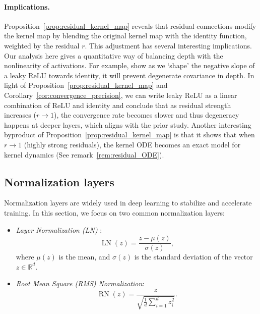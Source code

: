 \documentclass[twoside]{article}
\theoremstyle{definition}
\begin{document}
\paragraph{Implications.} Proposition~\ref{prop:residual_kernel_map} reveals that residual connections modify the kernel map by blending the original kernel map with the identity function, weighted by the residual $r$. This adjustment has several interesting implications. Our analysis here gives a quantitative way of balancing depth with the nonlinearity of activations. For example, \citet{li2022neural} show as we `shape' the negative slope of a leaky ReLU towards identity, it will prevent degenerate covariance in depth. In light of Proposition~\ref{prop:residual_kernel_map} and Corollary~\ref{cor:convergence_precision}, we can write leaky ReLU as a linear combination of ReLU and identity and conclude that as residual strength increases ($r\to 1$), the convergence rate becomes slower and thus degeneracy happens at deeper layers, which aligns with the prior study. 
Another interesting byproduct of Proposition~\ref{prop:residual_kernel_map} is that it shows that when $r\to 1$ (highly strong residuals), the kernel ODE becomes an exact model for kernel dynamics (See remark~\ref{rem:residual_ODE}).






\subsection{Normalization layers}

Normalization layers are widely used in deep learning to stabilize and accelerate training. In this section, we focus on two common normalization layers:
\begin{itemize}
    \item \textit{Layer Normalization (LN)} \citep{ba2016layer}:
  \begin{equation}
  \operatorname{LN}(z) = \frac{z - \mu(z)}{\sigma(z)},
  \end{equation}
  where $\mu(z)$ is the mean, and $\sigma(z)$ is the standard deviation of the vector $z \in \mathbb{R}^d$.
  \item \textit{Root Mean Square (RMS) Normalization}:
  \begin{equation}
  \operatorname{RN}(z) = \frac{z}{ \sqrt{ \frac{1}{d} \sum_{i=1}^d z_i^2 } }.
  \end{equation}
\end{itemize}
\end{document}
